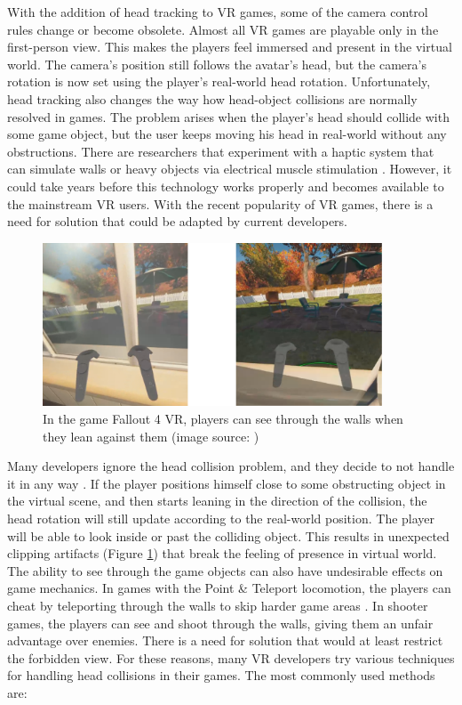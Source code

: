 With the addition of head tracking to VR games, some of the camera control rules change or become obsolete. Almost all VR games are playable only in the first-person view. This makes the players feel immersed and present in the virtual world. The camera's position still follows the avatar's head, but the camera's rotation is now set using the player’s real-world head rotation. Unfortunately, head tracking also changes the way how head-object collisions are normally resolved in games. The problem arises when the player's head should collide with some game object, but the user keeps moving his head in real-world without any obstructions. There are researchers that experiment with a haptic system that can simulate walls or heavy objects via electrical muscle stimulation \cite{HEPTICSYSTEM}. However, it could take years before this technology works properly and becomes available to the mainstream VR users. With the recent popularity of VR games, there is a need for solution that could be adapted by current developers.

\begin{figure}[th]
\centering
\includegraphics[width=0.9\textwidth]{img/clipping.png}
\caption{In the game Fallout 4 VR, players can see through the walls when they lean against them (image source: \cite{redditfallout})}
\label{fig:FALLOUTCLIPPING}
\end{figure}

Many developers ignore the head collision problem, and they decide to not handle it in any way \cite{OCULUSDOCCLIPPING}. If the player positions himself close to some obstructing object in the virtual scene, and then starts leaning in the direction of the collision, the head rotation will still update according to the real-world position. The player will be able to look inside or past the colliding object. This results in unexpected clipping artifacts (Figure \ref{fig:FALLOUTCLIPPING}) that break the feeling of presence in virtual world. The ability to see through the game objects can also have undesirable effects on game mechanics. In games with the Point \& Teleport locomotion, the players can cheat by teleporting through the walls to skip harder game areas \cite{SKYRIMTELEPORT}. In shooter games, the players can see and shoot through the walls, giving them an unfair advantage over enemies. There is a need for solution that would at least restrict the forbidden view. For these reasons, many VR developers try various techniques for handling head collisions in their games. The most commonly used methods are:


